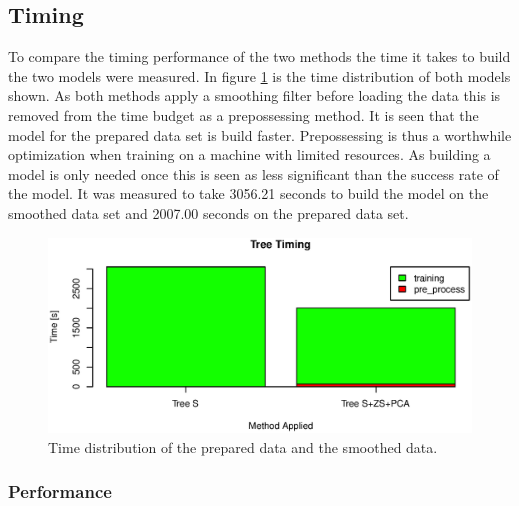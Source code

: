 
\subsection{Timing}
To compare the timing performance of the two methods the time it takes to build the two models were measured.
In figure \ref{fig:tree_time_distribution} is the time distribution of both models shown.
As both methods apply a smoothing filter before loading the data this is removed from the time budget as a prepossessing method.
It is seen that the model for the prepared data set is build faster.
Prepossessing is thus a worthwhile optimization when training on a machine with limited resources.
As building a model is only needed once this is seen as less significant than the success rate of the model.
It was measured to take 3056.21 seconds to build the model on the smoothed data set and 2007.00 seconds on the prepared data set.

\begin{figure}[h]
\centering
\includegraphics[width=\textwidth]{graphics/algo_compare_timing_tree}
\caption[Time distribution for decision tree.]{Time distribution of the prepared data and the smoothed data.}
\label{fig:tree_time_distribution}
\end{figure}

\subsubsection{Performance}


